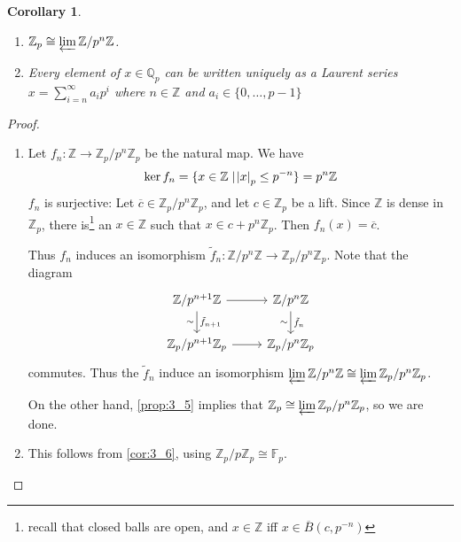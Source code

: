 \documentclass[11pt]{article}
\theoremstyle{definition}
\theoremstyle{plain}
\newtheorem{corollary}[definition]{Corollary}
\theoremstyle{remark}
\newcommand{\bF}{\mathbb{F}}
\newcommand{\bZ}{\mathbb{Z}}
\newcommand{\bQ}{\mathbb{Q}}
\begin{document}
\begin{corollary}\label{cor:3_7}\phantom{}
    \begin{enumerate}
        \item $\bZ_p \cong \varprojlim \bZ / p^n \bZ$.
        \item Every element of $x \in \bQ_p$ can be written uniquely as a Laurent series $x = \sum_{i=n}^\infty a_i p^i$ where $n \in \bZ$ and $a_i \in \{0, \ldots, p - 1\}$
    \end{enumerate}
\end{corollary}
\begin{proof}\phantom{}
    \begin{enumerate}
        \item Let $f_n : \bZ \to \bZ_p / p^n \bZ_p$ be the natural map. We have
            \begin{equation*}
                \ker{f_n} = \{x \in \bZ \mid \abs{x}_p \le p^{-n}\} = p^n \bZ
            \end{equation*}
            $f_n$ is surjective: Let $\overline{c} \in \bZ_p / p^n \bZ_p$, and let $c \in \bZ_p$ be a lift. Since $\bZ$ is dense in $\bZ_p$, there is\footnote{recall that closed balls are open, and $x \in \bZ$ iff $x \in \overline{B}(c, p^{-n})$} an $x \in \bZ$ such that $x \in c + p^n \bZ_p$. Then $f_n(x) = \overline{c}$.

            Thus $f_n$ induces an isomorphism $\tilde{f}_n : \bZ / p^n \bZ \to \bZ_p / p^n \bZ_p$. Note that the diagram
            \begin{equation*}
            \begin{tikzcd}
                \bZ/p^{n+1} \bZ \arrow[r]\arrow[d, "\tilde{f}_{n+1}", "\sim"'] & \bZ/p^n \bZ \arrow[d, "\tilde{f}_n", "\sim"']\\
                \bZ_p/p^{n+1} \bZ_p \arrow[r] & \bZ_p/p^n \bZ_p
            \end{tikzcd}
            \end{equation*}
            commutes. Thus the $\tilde{f}_n$ induce an isomorphism $\varprojlim \bZ/p^n\bZ \cong \varprojlim \bZ_p/p^n\bZ_p$.

            On the other hand, \autoref{prop:3_5} implies that $\bZ_p \cong \varprojlim \bZ_p / p^n \bZ_p$, so we are done.

        \item This follows from \autoref{cor:3_6}, using $\bZ_p / p \bZ_p \cong \bF_p$.\qedhere
    \end{enumerate}
\end{proof}
\end{document}
